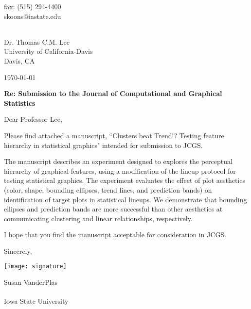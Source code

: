 \documentclass[11pt]{article}
\begin{document}
\hfill\begin{minipage}{.2\linewidth}

\flushright fax: (515) 294-4400\\
skoons@iastate.edu
\end{minipage}\vspace{1em}\\
Dr. Thomas C.M. Lee \\
University of California-Davis \\
Davis, CA\\\vspace{1em}

\today\\\vspace{1em}

{\bf Re: Submission to the Journal of Computational and Graphical Statistics}\\\vspace{2em}

Dear Professor Lee, \vspace{1em}

Please find attached a manuscript, ``Clusters beat Trend!? Testing feature hierarchy in statistical graphics" intended for submission to JCGS. \vspace{1em}

The manuscript describes an experiment designed to explores the perceptual hierarchy of graphical features, using a modification of the lineup protocol for testing statistical graphics. The experiment evaluates the effect of plot aesthetics (color, shape, bounding ellipses, trend lines, and prediction bands) on identification of target plots in statistical lineups. We demonstrate that bounding ellipses and prediction bands are more successful than other aesthetics at communicating clustering and linear relationships, respectively.\vspace{1em}

I hope that you find the manuscript acceptable for consideration in JCGS. \vspace{0.25in}

Sincerely,\\
\begin{minipage}{.25\linewidth}
\vspace*{.5cm}
\texttt{[image: signature]}
\vspace*{.5cm}
\end{minipage}

Susan VanderPlas\\
\hfill\ \phantom{.} \hfill\\
Iowa State University
\end{document}
